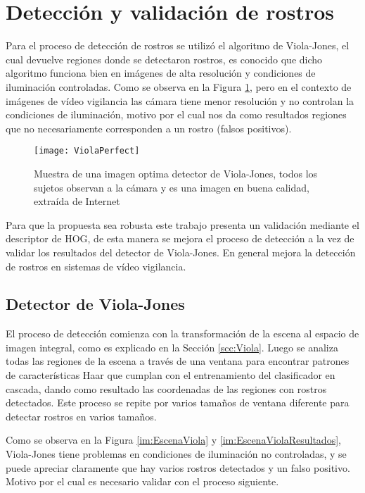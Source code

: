 \section{Detección y validación de rostros} 
Para el proceso de detección de rostros se utilizó el algoritmo de Viola-Jones, el cual devuelve regiones donde se detectaron rostros, es conocido que dicho algoritmo funciona bien en imágenes de alta resolución y condiciones de iluminación controladas. Como se observa en la Figura \ref{im:ViolaPerfect}, pero en el contexto de imágenes de vídeo vigilancia las cámara tiene menor resolución y no controlan la condiciones de iluminación, motivo por el cual nos da como resultados regiones que no necesariamente corresponden a un rostro (falsos positivos).

\begin{figure}[h]
\center
\texttt{[image: ViolaPerfect]}
\caption{Muestra de una imagen optima detector de Viola-Jones, todos los sujetos observan a la cámara y es una imagen en buena calidad, extraída de Internet}
\label{im:ViolaPerfect}
\end{figure}

Para que la propuesta sea robusta este trabajo presenta un validación mediante el descriptor de \ac{HOG}, de esta manera se mejora el proceso de detección a la vez de validar los resultados del detector de Viola-Jones. En general mejora la detección de rostros en sistemas de vídeo vigilancia.

\subsection{Detector de Viola-Jones}

El proceso de detección comienza con la transformación de la escena al espacio de imagen integral, como es explicado en la Sección \ref{scc:Viola}. Luego se analiza todas las regiones de la escena a través de una ventana para encontrar patrones de características Haar que cumplan con el entrenamiento del clasificador en cascada, dando como resultado las coordenadas de las regiones con rostros detectados. Este proceso se repite por varios tamaños de ventana diferente para detectar rostros en varios tamaños.


Como se observa en la Figura \ref{im:EscenaViola} y \ref{im:EscenaViolaResultados}, Viola-Jones tiene problemas en condiciones de iluminación no controladas, y se puede apreciar claramente que hay varios rostros detectados y un falso positivo. Motivo por el cual es necesario validar con el proceso siguiente.

